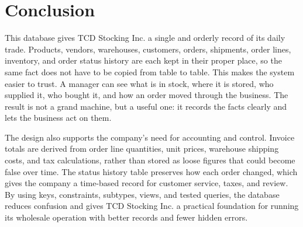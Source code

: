 \section{Conclusion}

This database gives TCD Stocking Inc. a single and orderly record of its daily trade. Products, vendors, warehouses, customers, orders, shipments, order lines, inventory, and order status history are each kept in their proper place, so the same fact does not have to be copied from table to table. This makes the system easier to trust. A manager can see what is in stock, where it is stored, who supplied it, who bought it, and how an order moved through the business. The result is not a grand machine, but a useful one: it records the facts clearly and lets the business act on them.

The design also supports the company's need for accounting and control. Invoice totals are derived from order line quantities, unit prices, warehouse shipping costs, and tax calculations, rather than stored as loose figures that could become false over time. The status history table preserves how each order changed, which gives the company a time-based record for customer service, taxes, and review. By using keys, constraints, subtypes, views, and tested queries, the database reduces confusion and gives TCD Stocking Inc. a practical foundation for running its wholesale operation with better records and fewer hidden errors.

